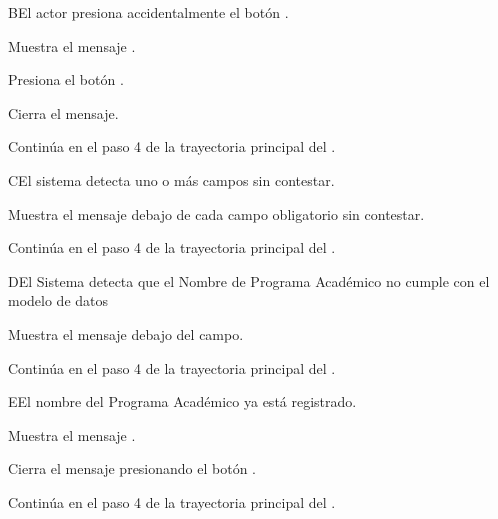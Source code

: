 
\begin{UCtrayectoriaA}{B}{El actor presiona accidentalmente el botón .}

    \UCpaso Muestra el mensaje .

    \UCpaso[\UCactor] Presiona el botón .

    \UCpaso Cierra el mensaje.

    \UCpaso Continúa en el paso 4 de la trayectoria principal del .

\end{UCtrayectoriaA}


\begin{UCtrayectoriaA}{C}{El sistema detecta uno o más campos sin contestar.}

    \UCpaso Muestra el mensaje  debajo de cada campo obligatorio sin contestar.

    \UCpaso Continúa en el paso 4 de la trayectoria principal del .

\end{UCtrayectoriaA}


\begin{UCtrayectoriaA}{D}{El Sistema detecta que el Nombre de Programa Académico no cumple con el modelo de datos}

    \UCpaso Muestra el mensaje  debajo del campo.

    \UCpaso Continúa en el paso 4 de la trayectoria principal del .

\end{UCtrayectoriaA}




\begin{UCtrayectoriaA}{E}{El nombre del Programa Académico ya está registrado.}

    \UCpaso Muestra el mensaje .

    \UCpaso[\UCactor] Cierra el mensaje presionando el botón .
    
    \UCpaso Continúa en el paso 4 de la trayectoria principal del .

\end{UCtrayectoriaA}

